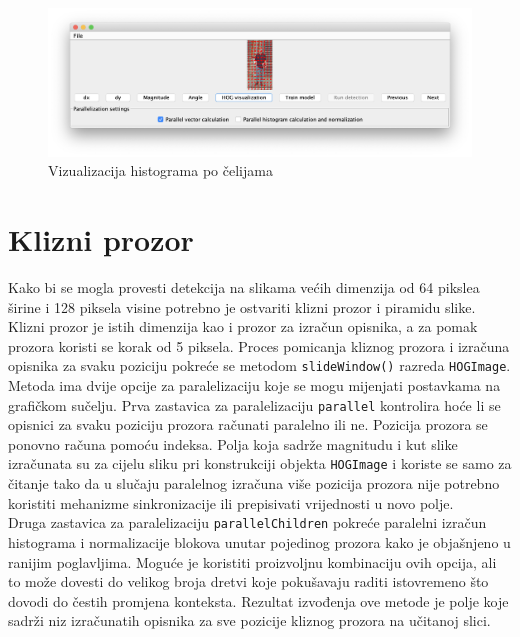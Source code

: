 \documentclass[times, utf8, zavrsni]{fer}
\begin{document}
\begin{figure}[htb]
	\centering
	\includegraphics[width=\linewidth]{figures/hogVisualization.png}
	\caption{Vizualizacija histograma po čelijama}
	\label{fig:hog}
\end{figure}

\section{Klizni prozor}
Kako bi se mogla provesti detekcija na slikama većih dimenzija od 64 pikslea širine i 128 piksela visine potrebno je ostvariti klizni prozor i piramidu slike. Klizni prozor je istih dimenzija kao i prozor za izračun opisnika, a za pomak prozora koristi se korak od 5 piksela. Proces pomicanja kliznog prozora i izračuna opisnika za svaku poziciju pokreće se metodom \verb|slideWindow()| razreda \verb|HOGImage|. Metoda ima dvije opcije za paralelizaciju koje se mogu mijenjati postavkama na grafičkom sučelju. Prva zastavica za paralelizaciju \verb|parallel| kontrolira hoće li se opisnici za svaku poziciju prozora računati paralelno ili ne. Pozicija prozora se ponovno računa pomoću indeksa. Polja koja sadrže magnitudu i kut slike izračunata su za cijelu sliku pri konstrukciji objekta \verb|HOGImage| i koriste se samo za čitanje tako da u slučaju paralelnog izračuna više pozicija prozora nije potrebno koristiti mehanizme sinkronizacije ili prepisivati vrijednosti u novo polje. \\

Druga zastavica za paralelizaciju \verb|parallelChildren| pokreće paralelni izračun histograma i normalizacije blokova unutar pojedinog prozora kako je objašnjeno u ranijim poglavljima. Moguće je koristiti proizvoljnu kombinaciju ovih opcija, ali to može dovesti do velikog broja dretvi koje pokušavaju raditi istovremeno što dovodi do čestih promjena konteksta. Rezultat izvođenja ove metode je polje koje sadrži niz izračunatih opisnika za sve pozicije kliznog prozora na učitanoj slici.
\end{document}
